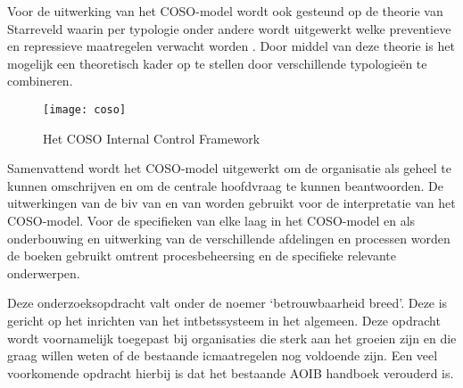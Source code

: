 Voor de uitwerking van het COSO-model wordt ook gesteund op de theorie van Starreveld waarin per \gls{typologie} onder andere wordt uitgewerkt welke preventieve en repressieve maatregelen verwacht worden \citep{jans,financiering,buunk}. Door middel van deze theorie is het mogelijk een theoretisch kader op te stellen door verschillende typologieën te combineren. 

\begin{figure}[!h]
    \centering
    \texttt{[image: coso]}
    \caption{Het COSO Internal Control Framework \citep{COSOsummery}}
    \label{fig:coso}
\end{figure}

Samenvattend wordt het COSO-model uitgewerkt om de organisatie als geheel te kunnen omschrijven en om de centrale hoofdvraag te kunnen beantwoorden. De uitwerkingen van de \gls{biv} van \citet{bivperspectief} en van \citet{bivpraktijk} worden gebruikt voor de interpretatie van het COSO-model. Voor de specifieken van elke laag in het COSO-model en als onderbouwing en uitwerking van de verschillende afdelingen en processen worden de boeken gebruikt omtrent procesbeheersing en de specifieke relevante onderwerpen. \citep{internebeheersing,jans,financiering,buunk}

Deze onderzoeksopdracht valt onder de noemer `betrouwbaarheid breed'. Deze is gericht op het inrichten van het \gls{intbet}ssysteem in het algemeen. Deze opdracht wordt voornamelijk toegepast bij organisaties die sterk aan het groeien zijn en die graag willen weten of de bestaande \gls{ic}maatregelen nog voldoende zijn. Een veel voorkomende opdracht hierbij is dat het bestaande AOIB handboek verouderd is. \citep{bivpraktijk}